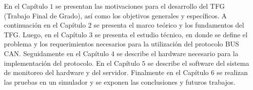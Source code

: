 En el Capítulo $1$ se presentan las motivaciones para el desarrollo del TFG (Trabajo Final de Grado), así como los objetivos generales y específicos. 
A continuación en el Capítulo $2$ se presenta el marco teórico y los fundamentos del TFG. Luego, en el Capítulo $3$ se presenta el estudio técnico, en donde se define el problema y los requerimientos necesarios para la utilización del protocolo BUS CAN. 
Seguidamente en el Capítulo $4$ se describe el hardware necesario para la implementación del protocolo. 
En el Capítulo $5$  se describe el software del sistema de monitoreo del hardware y del servidor. 
Finalmente en el Capítulo $6$ se realizan las pruebas en un simulador y se exponen las conclusiones y futuros trabajos.




